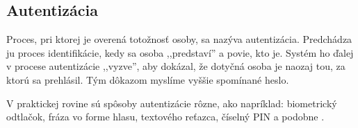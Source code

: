 \subsection{Autentizácia}
Proces, pri ktorej je overená totožnosť osoby, sa nazýva autentizácia. Predchádza ju proces identifikácie, kedy sa osoba ,,predstaví'' a povie, kto je. Systém ho ďalej v procese autentizácie ,,vyzve'', aby dokázal, že dotyčná osoba je naozaj tou, za ktorú sa prehlásil. Tým dôkazom myslíme vyššie spomínané heslo. \cite{bezpecnost_udajov}

V praktickej rovine sú spôsoby autentizácie rôzne, ako napríklad: biometrický odtlačok, fráza vo forme hlasu, textového reťazca, číselný PIN a podobne \cite{baka}. 